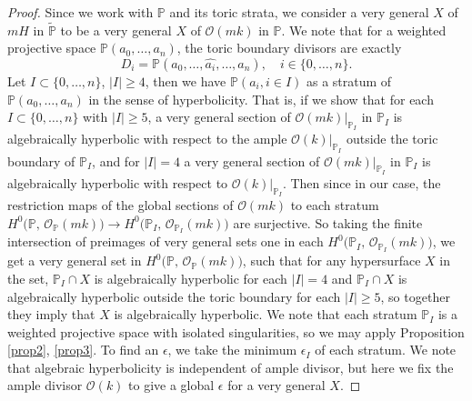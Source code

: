 \documentclass[10pt,a4paper]{amsart}
\begin{document}
\begin{proof}
Since we work with $\mathbb P$ and its toric strata, we consider a very general $X$ of $mH$ in $\widetilde{\mathbb P}$ to be a very general $X$ of $\mathcal O(mk)$ in $\mathbb P$. We note that for a weighted projective space $\mathbb{P}(a_0,\dots,a_n)$, the toric boundary divisors are exactly 
\[
D_i = \mathbb{P}(a_0,\dots,\widehat{a_i},\dots,a_n), \quad i \in \{0,\dots,n\}.
\] 
Let $I \subset \{0,\dots,n\}$, $|I|\geq 4$, then we have $\mathbb{P}(a_i, i \in I)$ as a stratum of $\mathbb{P}(a_0,\dots,a_n)$ in the sense of hyperbolicity. That is, if we show that for each $I \subset \{0,\dots,n\}$ with $|I|\geq 5$, a very general section of $\mathcal O(mk)|_{\mathbb{P}_I}$ in $\mathbb{P}_I$ is algebraically hyperbolic with respect to the ample $\mathcal O(k)|_{\mathbb{P}_I}$ outside the toric boundary of $\mathbb{P}_I$, and for $|I|=4$ a very general section of $\mathcal O(mk)|_{\mathbb{P}_I}$ in $\mathbb{P}_I$ is algebraically hyperbolic with respect to $\mathcal O(k)|_{\mathbb P_I}$. Then since in our case, the restriction maps of the global sections of $\mathcal O(mk)$ to each stratum $H^{0}\!\big(\mathbb{P},\, \mathcal{O}_{\mathbb{P}}(mk)\big)
\rightarrow
H^{0}\!\big(\mathbb{P}_{I},\, \mathcal{O}_{\mathbb{P}_{I}}(mk)\big)$ are surjective. So taking the finite intersection of preimages of very general sets one in each $H^{0}\!\big(\mathbb{P}_{I},\, \mathcal{O}_{\mathbb{P}_{I}}(mk)\big)$, we get a very general set in $H^{0}\!\big(\mathbb{P},\, \mathcal{O}_{\mathbb{P}}(mk)\big)$, such that for any hypersurface $X$ in the set, $\mathbb P_I \cap X$ is algebraically hyperbolic for each $|I| = 4$ and $\mathbb P_I \cap X$ is algebraically hyperbolic outside the toric boundary for each $|I| \geq 5$, so together they imply that $X$ is algebraically hyperbolic. We note that each stratum $\mathbb P_I$ is a weighted projective space with isolated singularities, so we may apply Proposition \ref{prop2}, \ref{prop3}. To find an $\epsilon$, we take the minimum $\epsilon_I$ of each stratum. We note that algebraic hyperbolicity is independent of ample divisor, but here we fix the ample divisor $\mathcal O(k)$ to give a global $\epsilon$ for a very general $X$. 


\end{proof}
\end{document}
